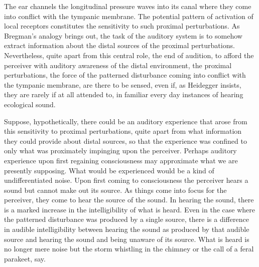 The ear channels the longitudinal pressure waves into its canal where they come into conflict with the tympanic membrane. The potential pattern of activation of local receptors constitutes the sensitivity to such proximal perturbations. As Bregman's analogy brings out, the task of the auditory system is to somehow extract information about the distal sources of the proximal perturbations. Nevertheless, quite apart from this central role, the end of audition, to afford the perceiver with auditory awareness of the distal environment, the proximal perturbations, the force of the patterned disturbance coming into conflict with the tympanic membrane, are there to be sensed, even if, as Heidegger insists, they are rarely if at all attended to, in familiar every day instances of hearing ecological sound.

Suppose, hypothetically, there could be an auditory experience that arose from this sensitivity to proximal perturbations, quite apart from what information they could provide about distal sources, so that the experience was confined to only what was proximately impinging upon the perceiver. Perhaps auditory experience upon first regaining consciousness may approximate what we are presently supposing. What would be experienced would be a kind of undifferentiated noise. Upon first coming to consciousness the perceiver hears a sound but cannot make out its source. As things come into focus for the perceiver, they come to hear the source of the sound. In hearing the sound, there is a marked increase in the intelligibility of what is heard. Even in the case where the patterned disturbance was produced by a single source, there is a difference in audible intelligibility between hearing the sound as produced by that audible source and hearing the sound and being unaware of its source. What is heard is no longer mere noise but the storm whistling in the chimney or the call of a feral parakeet, say.

